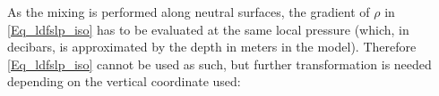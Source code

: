 \documentclass[NEMO_book]{subfiles}
\begin{document}



As the mixing is performed along neutral surfaces, the gradient of $\rho$ in 
\eqref{Eq_ldfslp_iso} has to be evaluated at the same local pressure (which, 
in decibars, is approximated by the depth in meters in the model). Therefore 
\eqref{Eq_ldfslp_iso} cannot be used as such, but further transformation is 
needed depending on the vertical coordinate used:
\end{document}
